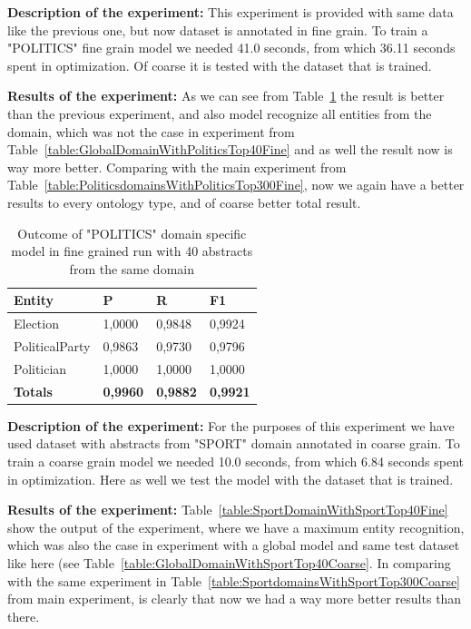 \documentclass[thesis=M,english]{FITthesis}[2018/05/30]
\begin{document}
	\textbf{Description of the experiment:} This experiment is provided with same data like the previous one, but now dataset is annotated in fine grain. To train a "POLITICS" fine grain model we needed 41.0 seconds, from which 36.11 seconds spent in optimization. Of coarse it is tested with the dataset that is trained.

	\textbf{Results of the experiment:} As we can see from Table~\ref{table:PoliticsDomainWithPoliticsTop40Fine} the result is better than the previous experiment, and also model recognize all entities from the domain, which was not the case in experiment from Table~\ref{table:GlobalDomainWithPoliticsTop40Fine} and as well the result now is way more better. Comparing with the main experiment from Table~\ref{table:PoliticsdomainsWithPoliticsTop300Fine}, now we again have a better results to every ontology type, and of coarse better total result. 
		
	\begin{table}[H]\centering
		\begin{tabular}{|l|l|l|l|}
			\hline {\textbf{Entity}} & {\textbf{P}} & {\textbf{R}} & {\textbf{F1}}\\\hline
				Election & 1,0000 & 0,9848 & 0,9924\\
				PoliticalParty & 0,9863 & 0,9730 & 0,9796\\
				Politician & 1,0000 & 1,0000 & 1,0000\\\hline
				\textbf{Totals} & \textbf{0,9960} & \textbf{0,9882} & \textbf{0,9921}\\\hline
		\end{tabular}
		\caption{Outcome of "POLITICS" domain specific model in fine grained run with 40 abstracts from the same domain \label{table:PoliticsDomainWithPoliticsTop40Fine}}
	\end{table}
			

	\textbf{Description of the experiment:} For the purposes of this experiment we have used dataset with abstracts from "SPORT" domain annotated in coarse grain. To train a coarse grain model we needed 10.0 seconds, from which 6.84 seconds spent in optimization. Here as well we test the model with the dataset that is trained.

	\textbf{Results of the experiment:} Table~\ref{table:SportDomainWithSportTop40Fine} show the output of the experiment, where we have a maximum entity recognition, which was also the case in experiment with a global model and same test dataset like here (see Table~\ref{table:GlobalDomainWithSportTop40Coarse}. In comparing with the same experiment in Table~\ref{table:SportdomainsWithSportTop300Coarse} from main experiment, is clearly that now we had a way more better results than there.  
	
\end{document}
